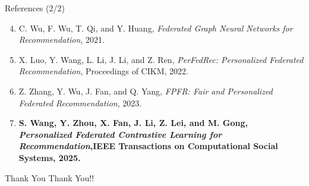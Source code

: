 \documentclass{beamer}
\begin{document}
\begin{frame}{References (2/2)}
\small

\begin{enumerate}
  \setcounter{enumi}{3} %

  \item \hypertarget{ref:fedgnn}{}
  C. Wu, F. Wu, T. Qi, and Y. Huang,
  \emph{Federated Graph Neural Networks for Recommendation},
  2021.

  \item \hypertarget{ref:perfedrec}{}
  X. Luo, Y. Wang, L. Li, J. Li, and Z. Ren,
  \emph{PerFedRec: Personalized Federated Recommendation},
  Proceedings of CIKM, 2022.

  \item \hypertarget{ref:fpfr}{}
  Z. Zhang, Y. Wu, J. Fan, and Q. Yang,
  \emph{FPFR: Fair and Personalized Federated Recommendation},
  2023.

  \item \hypertarget{ref:fedpcl}{}
  \textbf{S. Wang, Y. Zhou, X. Fan, J. Li, Z. Lei, and M. Gong,} \\
  \textbf{\emph{Personalized Federated Contrastive Learning for Recommendation},IEEE Transactions on Computational Social Systems, 2025.}

\end{enumerate}

\end{frame}


\begin{frame}{Thank You}
\centering
\Huge Thank You!! \\
\vspace{1cm}
\end{frame}
\end{document}
